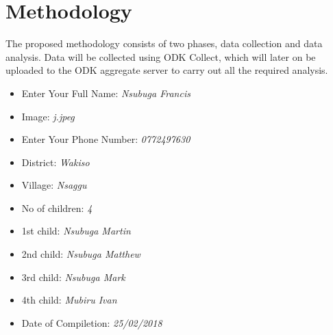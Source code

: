 \documentclass[options]{article}
\begin{document}
\section{\textbf{Methodology}}
The proposed methodology consists of two phases, data collection and data analysis.\bigbreak
Data will be collected using ODK Collect, which will later on be uploaded to the ODK aggregate server to carry out all the required analysis.

\begin{itemize}
\item Enter Your Full Name: \textit{Nsubuga Francis}
\item Image: \textit{j.jpeg}
\item Enter Your Phone Number: \textit{0772497630}
\item District: \textit{Wakiso}
\item Village: \textit{Nsaggu}
\item No of children: \textit{4}
\item 1st child: \textit{Nsubuga Martin}
\item 2nd child: \textit{Nsubuga Matthew}
\item3rd child: \textit{Nsubuga Mark}
\item 4th child: \textit{Mubiru Ivan}
\item Date of Compiletion: \textit{25/02/2018}

\end{itemize}

 
\end{document}
